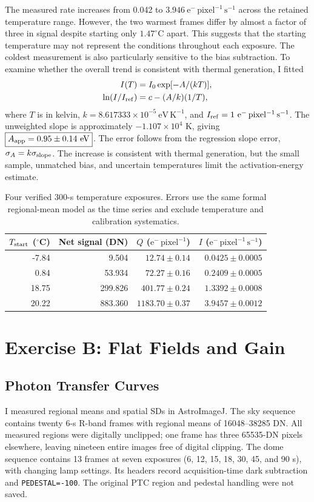 \documentclass[12pt,letterpaper,twocolumn]{article}
\begin{document}
The measured rate increases from 0.042 to
$3.946~\mathrm{e^-\,pixel^{-1}\,s^{-1}}$ across the retained
temperature range. However, the two warmest frames differ by almost a
factor of three in signal despite starting only $1.47^\circ$C apart.
This suggests that the starting temperature may not represent the
conditions throughout each exposure. The coldest measurement is also
particularly sensitive to the bias subtraction. To examine whether the
overall trend is consistent with thermal generation, I fitted
\begin{align}
I(T)&=I_0\exp[-A/(kT)],\\
\ln(I/I_{\rm ref})&=c-(A/k)(1/T),
\end{align}
where $T$ is in kelvin,
$k=8.617333\times10^{-5}~\mathrm{eV\,K^{-1}}$, and
$I_{\rm ref}=1~\mathrm{e^-\,pixel^{-1}\,s^{-1}}$.
The unweighted slope is approximately $-1.107\times10^4$ K, giving
$\boxed{A_{\rm app}=0.95\pm0.14~\mathrm{eV}}$. The error follows from the regression
slope error, $\sigma_A=k\sigma_{\rm slope}$. The increase is consistent with thermal generation, but the small sample, unmatched bias, and uncertain temperatures limit the activation-energy estimate.
\begin{table}[tp]
\centering\small\caption{Four verified 300-s temperature exposures. Errors use the same formal regional-mean model as the time series and exclude temperature and calibration systematics.}\label{tab:a_dark_temperature}
\begin{tabular}{rrrr}\toprule
$T_{\rm start}$ ($^\circ$C) & Net signal (DN) & $Q$ ($\mathrm{e^-\,pixel^{-1}}$) & $I$ ($\mathrm{e^-\,pixel^{-1}\,s^{-1}}$)\\\midrule
-7.84 & 9.504 & $12.74\pm0.14$ & $0.0425\pm0.0005$\\
0.84 & 53.934 & $72.27\pm0.16$ & $0.2409\pm0.0005$\\
18.75 & 299.826 & $401.77\pm0.24$ & $1.3392\pm0.0008$\\
20.22 & 883.360 & $1183.70\pm0.37$ & $3.9457\pm0.0012$\\
\bottomrule\end{tabular}
\end{table}





\section{Exercise B: Flat Fields and Gain}
\subsection{Photon Transfer Curves}
I measured regional means and spatial SDs in AstroImageJ. The sky
sequence contains twenty 6-s R-band frames with regional means of
16048--38285 DN. All measured regions were digitally unclipped;
one frame has three 65535-DN pixels elsewhere, leaving nineteen
entire images free of digital clipping. The dome sequence contains
13 frames at seven exposures (6, 12, 15, 18, 30, 45, and 90 s),
with changing lamp settings. Its headers record acquisition-time
dark subtraction and \texttt{PEDESTAL=-100}. The original PTC
region and pedestal handling were not saved.
\end{document}
